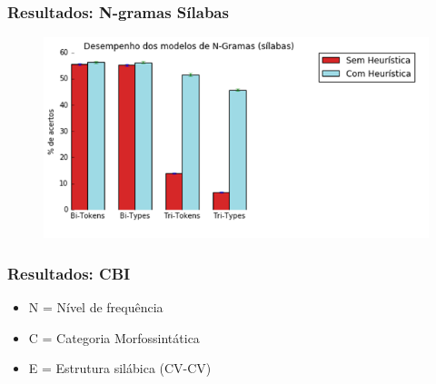 \documentclass[xcolor=table]{beamer}
\begin{document}
	\begin{frame}
		\frametitle{Resultados: N-gramas Sílabas}
		\begin{figure}
\centering
\includegraphics[width=0.7\linewidth]{graf-ngramas-sil}
\label{fig:graf-ngramas-sil}
\end{figure}

	\end{frame}	
	\begin{frame}
		\frametitle{Resultados: CBI}
		\begin{itemize}

			\item N = Nível de frequência\\
			\item C = Categoria Morfossintática\\
			\item E = Estrutura silábica (CV-CV)\\
		\end{itemize}
	\end{frame}
	
\end{document}

